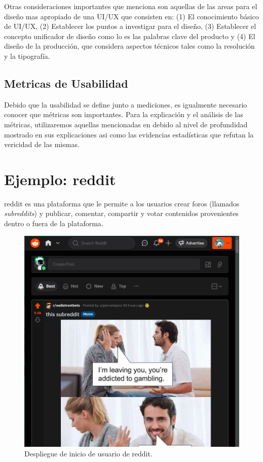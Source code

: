 Otras consideraciones importantes que \cite{joo-2017}  %
menciona son aquellas de las areas para el diseño mas apropiado de una UI/UX que consisten en:
(1) El conocimiento básico de UI/UX, (2) Establecer los puntos a investigar para el diseño,
(3) Establecer el concepto unificador de diseño como lo es las palabras clave del producto y
(4) El diseño de la producción, que considera aspectos técnicos tales como la resolución y la tipografía.

\subsection{Metricas de Usabilidad}
Debido que la usabilidad se define junto a mediciones, es igualmente necesario conocer que métricas son
importantes. Para la explicación y el análisis de las métricas, utilizaremos aquellas mencionadas en \cite{kokol-1995,purchase-2011,hentati-2015} %
debido al nivel de profundidad mostrado en sus explicaciones asi como las evidencias estadísticas
que refutan la vericidad de las mismas.
\\

\section{Ejemplo: reddit}
reddit es una plataforma que le permite a los usuarios crear foros (llamados \emph{subreddits}) y
publicar, comentar, compartir y votar contenidos provenientes dentro o fuera de la plataforma.
\begin{figure}[t]
    \centering
    \includegraphics[scale=0.33]{../images/fig2.png}
    \caption{Despliegue de inicio de usuario de reddit.}
    \label{fig:fig2}    
\end{figure}
\\

